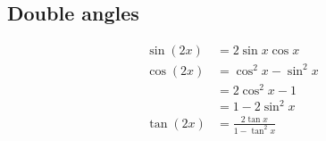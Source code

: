 \subsection*{Double angles}

\begin{align*}
  \sin(2x)  &= 2 \sin x \cos x\\
  \cos(2x)  &= \cos^2 x - \sin^2 x\\
            &= 2 \cos^2 x - 1\\
            &= 1 - 2 \sin^2 x\\
  \tan(2x)  &= \frac{2 \tan x}{1 - \tan^2 x}
\end{align*}